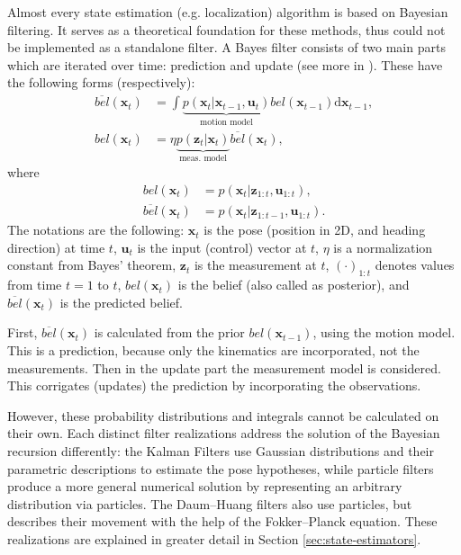 Almost every state estimation (e.g. localization) algorithm is based on Bayesian filtering.
It serves as a theoretical foundation for these methods, thus could not be implemented as a
standalone filter.
A Bayes filter consists of two main parts which are iterated over time: prediction and update (see more in \cite{Thrun2005}).
These have the following forms (respectively):
\begin{align}
    \overline{bel}(\mathbf{x}_t) & = \int \underbrace{p(\mathbf{x}_t | \mathbf{x}_{t-1},\mathbf{u}_t)}_{\text{motion model}}bel(\mathbf{x}_{t-1})\mathrm{d}\mathbf{x}_{t-1}, \label{eq:bayes-predict} \\
    bel(\mathbf{x}_t)            & = \eta \underbrace{p(\mathbf{\mathbf{z}}_t | \mathbf{x}_t)}_{\text{meas. model}}\overline{bel}(\mathbf{x}_t),
\end{align}
where
\begin{align}\label{key}
    bel(\mathbf{x}_t)            & = p(\mathbf{x}_t|\mathbf{z}_{1:t},\mathbf{u}_{1:t}),                      \\
    \overline{bel}(\mathbf{x}_t) & = p(\mathbf{x}_t|\mathbf{z}_{1:t-1},\mathbf{u}_{1:t}) \label{eq:predbel}.
\end{align}
The notations are the following: $\mathbf{x}_t$ is the pose (position in 2D, and heading direction) at time $t$,
$\mathbf{u}_t$ is the input (control) vector at $t$, $\eta$ is a normalization constant from  Bayes' theorem,
$\mathbf{z}_t$ is the measurement at $t$, $(\cdot)_{1:t}$ denotes values from time $t = 1$ to $t$,
$bel(\mathbf{x}_t)$ is the belief (also called as posterior), and  $\overline{bel}(\mathbf{x}_t)$ is the predicted belief.

First, $\overline{bel}(\mathbf{x}_t)$ is calculated from the prior $bel(\mathbf{x}_{t-1})$, using the motion model.
This is a prediction, because only the kinematics are incorporated, not the measurements.
Then in the update part the measurement model is considered.
This corrigates (updates) the prediction by incorporating the observations.

However, these probability distributions and integrals cannot be calculated on their own.
Each distinct filter realizations address the solution of the Bayesian recursion differently:
the Kalman Filters use Gaussian distributions and their parametric descriptions to estimate the pose hypotheses,
while particle filters produce a more general numerical solution by representing an arbitrary distribution via particles.
The Daum--Huang filters also use particles, but describes their movement with the help of the Fokker--Planck equation.
These realizations are explained in greater detail in Section \ref{sec:state-estimators}.


